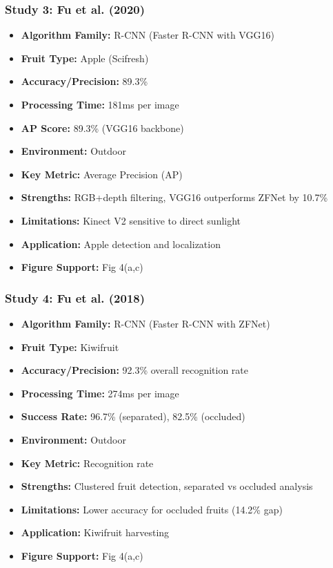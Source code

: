 \documentclass[11pt]{article}
\begin{document}
\subsubsection{Study 3: Fu et al. (2020) \cite{fu2020faster}}
\begin{itemize}
    \item \textbf{Algorithm Family:} R-CNN (Faster R-CNN with VGG16)
    \item \textbf{Fruit Type:} Apple (Scifresh)
    \item \textbf{Accuracy/Precision:} 89.3\%
    \item \textbf{Processing Time:} 181ms per image
    \item \textbf{AP Score:} 89.3\% (VGG16 backbone)
    \item \textbf{Environment:} Outdoor
    \item \textbf{Key Metric:} Average Precision (AP)
    \item \textbf{Strengths:} RGB+depth filtering, VGG16 outperforms ZFNet by 10.7\%
    \item \textbf{Limitations:} Kinect V2 sensitive to direct sunlight
    \item \textbf{Application:} Apple detection and localization
    \item \textbf{Figure Support:} Fig 4(a,c)
\end{itemize}

\subsubsection{Study 4: Fu et al. (2018) \cite{fu2018kiwifruit}}
\begin{itemize}
    \item \textbf{Algorithm Family:} R-CNN (Faster R-CNN with ZFNet)
    \item \textbf{Fruit Type:} Kiwifruit
    \item \textbf{Accuracy/Precision:} 92.3\% overall recognition rate
    \item \textbf{Processing Time:} 274ms per image
    \item \textbf{Success Rate:} 96.7\% (separated), 82.5\% (occluded)
    \item \textbf{Environment:} Outdoor
    \item \textbf{Key Metric:} Recognition rate
    \item \textbf{Strengths:} Clustered fruit detection, separated vs occluded analysis
    \item \textbf{Limitations:} Lower accuracy for occluded fruits (14.2\% gap)
    \item \textbf{Application:} Kiwifruit harvesting
    \item \textbf{Figure Support:} Fig 4(a,c)
\end{itemize}
\end{document}

